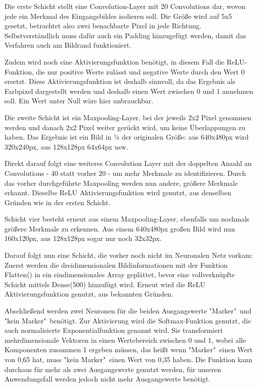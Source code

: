 \documentclass[conference]{IEEEtran}
\begin{document}
	Die erste Schicht stellt eine Convolution-Layer mit 20 Convolutions dar, 
	wovon jede ein Merkmal des Eingangsbildes isolieren soll.
	Die Größe wird auf 5x5 gesetzt, betrachtet also zwei benachbarte Pixel in 
	jede Richtung.
	Selbstverständlich muss dafür auch ein Padding hinzugefügt werden, damit das Verfahren auch am Bildrand funktioniert. 
	
	Zudem wird noch eine Aktivierungsfunktion benötigt, in diesem Fall  die 
	ReLU-Funktion, die nur positive Werte zulässt und negative Werte durch 
	den Wert 0 ersetzt.
	Diese Aktivierungsfunktion ist deshalb sinnvoll, da das Ergebnis als 
	Farbpixel dargestellt werden und deshalb einen Wert zwischen 0 und 1 
	annehmen soll.
	Ein Wert unter Null wäre hier unbrauchbar.

	
	Die zweite Schicht ist ein Maxpooling-Layer, bei der jeweils 2x2 Pixel 
	genommen werden und danach 2x2 Pixel weiter gerückt wird, um keine 
	Überlappungen zu haben.
	Das Ergebnis ist ein Bild in ¼ der originalen Größe: aus 640x480px wird 320x240px, aus 128x128px 64x64px usw.
	
	Direkt darauf folgt eine weiteres Convolution Layer mit der doppelten 
	Anzahl an Convolutions - 40 statt vorher 20 - um mehr Merkmale zu 
	identifizieren.
	Durch das vorher durchgeführte Maxpooling werden nun andere, größere Merkmale erkannt.
	 Dieselbe ReLU Aktivierungsfunktion wird genutzt, aus denselben 
	 Gründen wie in der ersten Schicht.
	
	Schicht vier besteht erneut aus einem Maxpooling-Layer, ebenfalls um nochmals größere Merkmale zu erkennen.
	Aus einem 640x480px großen Bild wird nun 160x120px, aus 128x128px sogar nur noch 32x32px.
	
	Darauf folgt nun eine Schicht, die vorher noch nicht im Neuronalen Netz vorkam:
	Zuerst werden die dreidimensionalen Bildinformationen mit der Funktion 
	Flatten() in ein eindimensionales Array geplättet, bevor eine 
	vollverknüpfte Schicht mittels Dense(500) hinzufügt wird.
	Erneut wird die ReLU Aktivierungsfunktion genutzt, aus bekannten 
	Gründen.

	Abschließend werden zwei Neuronen für die beiden Ausgangswerte 
	"Marker"\ und "kein Marker"\ benötigt.
	Zur Aktivierung wird die Softmax-Funktion genutzt, die auch 
	normalisierte Exponentialfunktion genannt wird.
	Sie transformiert mehrdimensionale Vektoren in einen Wertebereich zwischen 0 und 1, wobei alle Komponenten zusammen 1 ergeben müssen, das heißt wenn "Marker"\ einen Wert von 0,65 hat, muss "kein Marker"\ einen Wert von 0,35 haben. 
	Die Funktion kann durchaus für mehr als zwei Ausgangswerte genutzt werden, für unseren Anwendungsfall werden jedoch nicht mehr Ausgangswerte benötigt.
	
\end{document}
